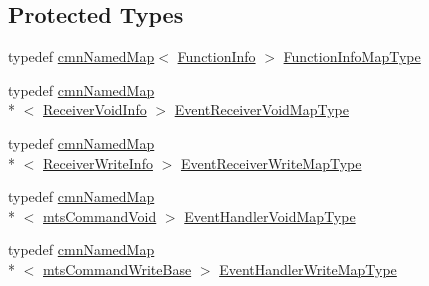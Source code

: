 \subsection*{Protected Types}
\begin{DoxyCompactItemize}
\item 
typedef \hyperlink{classcmn_named_map}{cmn\-Named\-Map}$<$ \hyperlink{classmts_interface_required_ade456f015f7ec3569d23f4a29a147ede}{Function\-Info} $>$ \hyperlink{classmts_interface_required_a4c21eaf53811c5782bae6293904cffe5}{Function\-Info\-Map\-Type}
\item 
typedef \hyperlink{classcmn_named_map}{cmn\-Named\-Map}\\*
$<$ \hyperlink{classmts_interface_required_a7ddf0b5c0205b5a512562171275ff1c3}{Receiver\-Void\-Info} $>$ \hyperlink{classmts_interface_required_a4f0c15e3c51f635a969eb8706a55afb1}{Event\-Receiver\-Void\-Map\-Type}
\item 
typedef \hyperlink{classcmn_named_map}{cmn\-Named\-Map}\\*
$<$ \hyperlink{classmts_interface_required_a66d230e43ed3c2bb07f0593a997f06cc}{Receiver\-Write\-Info} $>$ \hyperlink{classmts_interface_required_a58a4a6a94697fbb23d2884cf6cbf2a0b}{Event\-Receiver\-Write\-Map\-Type}
\item 
typedef \hyperlink{classcmn_named_map}{cmn\-Named\-Map}\\*
$<$ \hyperlink{classmts_command_void}{mts\-Command\-Void} $>$ \hyperlink{classmts_interface_required_a1f6cca73d8dffb794e3778092b375783}{Event\-Handler\-Void\-Map\-Type}
\item 
typedef \hyperlink{classcmn_named_map}{cmn\-Named\-Map}\\*
$<$ \hyperlink{classmts_command_write_base}{mts\-Command\-Write\-Base} $>$ \hyperlink{classmts_interface_required_a8ea82ecaf05dc0aca4595ac685b8a43f}{Event\-Handler\-Write\-Map\-Type}
\end{DoxyCompactItemize}
